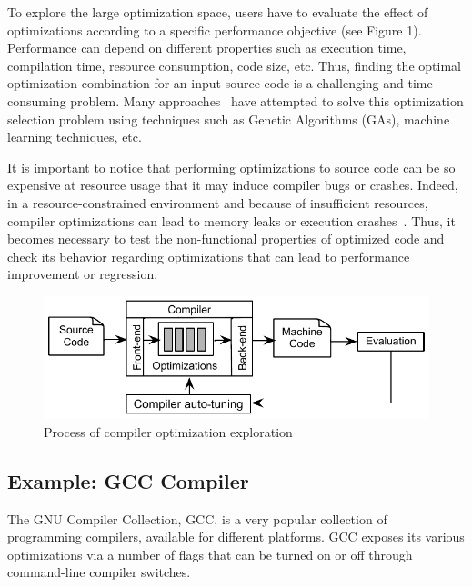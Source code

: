 To explore the large optimization space, users have to evaluate the effect of optimizations according to a specific performance objective (see Figure 1). Performance can depend on different properties such as execution time, compilation time, resource consumption, code size, etc.
Thus, finding the optimal optimization combination for an input source code is a challenging and time-consuming problem. 
Many approaches~\cite{hoste2008cole,martins2014exploration} have attempted to solve this optimization selection problem using techniques such as Genetic Algorithms (GAs), machine learning techniques, etc.

It is important to notice that performing optimizations to source code can be so expensive at resource usage that it may induce compiler bugs or crashes. 
Indeed, in a resource-constrained environment and because of insufficient resources, compiler optimizations can lead to memory leaks or execution crashes~\cite{yang2011finding}. 
Thus, it becomes necessary to test the non-functional properties of optimized code and check its behavior regarding optimizations that can lead to performance improvement or regression.


\begin{figure}[h]
	\centering
	\includegraphics[width=0.9\linewidth]{chapitre3/fig/autotuning.pdf}
	\caption{Process of compiler optimization exploration}
	
\end{figure}

\subsection{Example: GCC Compiler}

The GNU Compiler Collection, GCC, is a very popular collection of programming compilers, available for different platforms.
GCC exposes its various optimizations via a number of flags that can be turned on or off through command-line compiler switches. 

